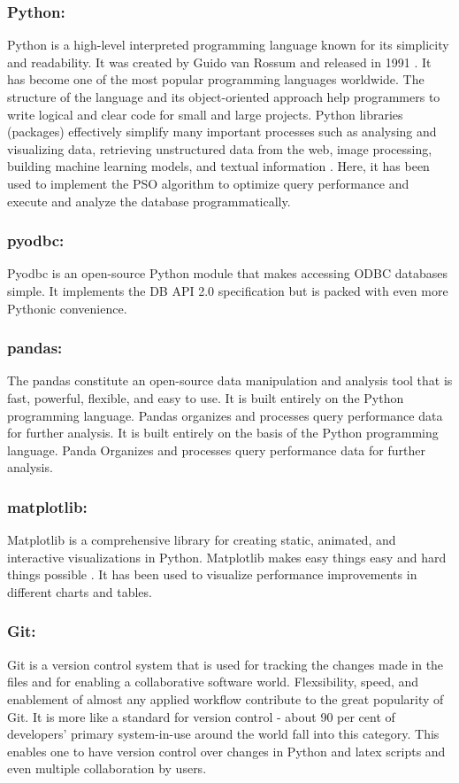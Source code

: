 \subsubsection{Python:} Python is a high-level interpreted programming language known for its simplicity and readability. It was created by Guido van Rossum and released in 1991 \cite{martin2023stam,wijanarko2020prediksi} . It has become one of the most popular programming languages worldwide. The structure of the language and its object-oriented approach help programmers to write logical and clear code for small and large projects. Python libraries (packages) effectively simplify many important processes such as analysing and visualizing data, retrieving unstructured data from the web, image processing, building machine learning models, and textual information \cite{Samira_Gholizadeh2022}. Here, it has been used to implement the PSO algorithm to optimize query performance and execute and analyze the database programmatically.

\subsubsection{pyodbc:} Pyodbc is an open-source Python module that makes accessing ODBC databases simple. It implements the DB API 2.0 specification but is packed with even more Pythonic convenience.

\subsubsection{pandas:} The pandas constitute an open-source data manipulation and analysis tool that is fast, powerful, flexible, and easy to use. It is built entirely on the Python programming language. Pandas organizes and processes query performance data for further analysis. It is built entirely on the basis of the Python programming language. Panda Organizes and processes query performance data for further analysis.

\subsubsection{matplotlib:} Matplotlib is a comprehensive library for creating static, animated, and interactive visualizations in Python. Matplotlib makes easy things easy and hard things possible \cite{matplotlib}. It has been used to visualize performance improvements in different charts and tables. 
\subsubsection{Git:} Git is a version control system that is used for tracking the changes made in the files and for enabling a collaborative software world. Flexsibility, speed, and enablement of almost any applied workflow contribute to the great popularity of Git. It is more like a standard for version control - about 90 per cent of developers' primary system-in-use around the world fall into this category. This enables one to have version control over changes in Python and latex scripts and even multiple collaboration by users.
